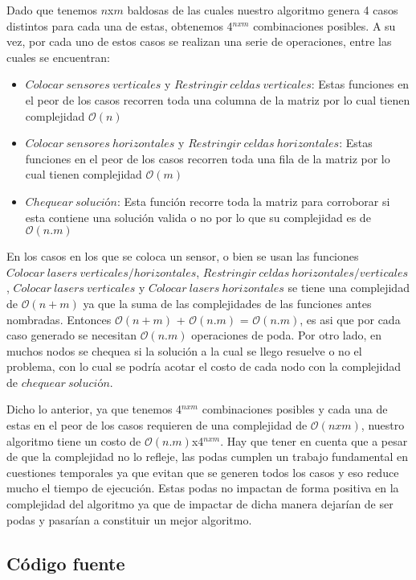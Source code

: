 Dado que tenemos $n$x$m$ baldosas de las cuales nuestro algoritmo genera 4 casos distintos para cada una de estas, obtenemos 4$^{nxm}$ combinaciones posibles. A su vez, por cada uno de estos casos se realizan una serie de operaciones, entre las cuales se encuentran:
\begin{itemize}
\item $Colocar\ sensores\ verticales$ y $Restringir\ celdas\ verticales$: Estas funciones en el peor de los casos recorren toda una columna de la matriz por lo cual tienen complejidad $\mathcal{O}(n)$
\item $Colocar\ sensores\ horizontales$ y $Restringir\ celdas\ horizontales$: Estas funciones en el peor de los casos recorren toda una fila de la matriz por lo cual tienen complejidad $\mathcal{O}(m)$
\item $Chequear\ solución$: Esta función recorre toda la matriz para corroborar si esta contiene una solución valida o no por lo que su complejidad es de $\mathcal{O}(n.m)$
\end{itemize}

En los casos en los que se coloca un sensor, o bien se usan las funciones $Colocar\ lasers\ verticales/horizontales$, $Restringir\ celdas\ horizontales/verticales$, $Colocar\ lasers\ verticales$ y $Colocar\ lasers\ horizontales$ se tiene una complejidad de $\mathcal{O}(n+m)$ ya que la suma de las complejidades de las funciones antes nombradas. Entonces $\mathcal{O}(n+m)$ + $\mathcal{O}(n.m)$ = $\mathcal{O}(n.m)$, es asi que por cada caso generado se necesitan $\mathcal{O}(n.m)$ operaciones de poda. \newline
 Por otro lado, en muchos nodos se chequea si la solución a la cual se llego resuelve o no el problema, con lo cual se podría acotar el costo de cada nodo con la complejidad de $chequear\ solución$. 

Dicho lo anterior, ya que tenemos 4$^{nxm}$ combinaciones posibles y cada una de estas en el peor de los casos requieren de una complejidad de $\mathcal{O}(nxm)$, nuestro algoritmo tiene un costo de $\mathcal{O}(n.m)$x4$^{nxm}$. Hay que tener en cuenta que a pesar de que la complejidad no lo refleje, las podas cumplen un trabajo fundamental en cuestiones temporales ya que evitan que se generen todos los casos y eso reduce mucho el tiempo de ejecución. Estas podas no impactan de forma positiva en la complejidad del algoritmo ya que de impactar de dicha manera dejarían de ser podas y pasarían a constituir un mejor algoritmo.
\subsection{Código fuente}

